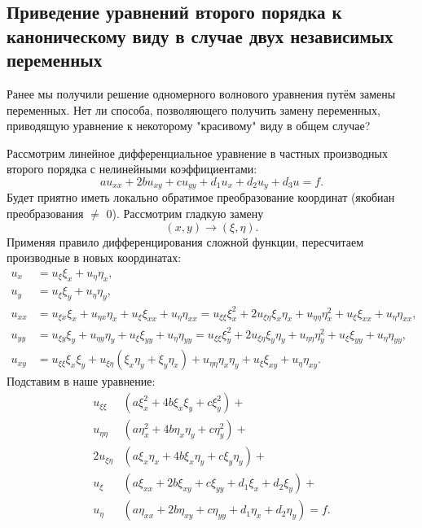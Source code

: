 
\subsection{Приведение уравнений второго порядка к каноническому виду в случае двух независимых переменных}

Ранее мы получили решение одномерного волнового уравнения путём замены переменных. Нет ли способа, позволяющего получить замену переменных, приводящую уравнение к некоторому "красивому" виду в общем случае?

Рассмотрим линейное дифференциальное уравнение в частных производных второго порядка с нелинейными коэффициентами:
$$ a u_{xx} + 2bu_{xy} + c u_{yy} + d_1 u_x + d_2 u_y + d_3 u = f.$$
Будет приятно иметь локально обратимое преобразование координат (якобиан преобразования $\neq$ 0). Рассмотрим гладкую замену 
$$(x,y) \rightarrow (\xi, \eta).$$
Применяя правило дифференцирования сложной функции, пересчитаем производные в новых координатах:
\begin{align*}
	u_x &= u_\xi \xi_x + u_\eta \eta_x, \\
	u_y &= u_\xi \xi_y + u_\eta \eta_y, \\
	u_{xx} &= u_{\xi x} \xi_x + u_{\eta x} \eta_x + u_\xi \xi_{xx} + u_\eta \eta_{xx} = u_{\xi \xi} \xi^2_x + 2u_{\xi \eta} \xi_x \eta_x + u_{\eta \eta} \eta^2_x + u_\xi \xi_{xx} + u_\eta \eta_{xx}, \\
	u_{yy} &= u_{\xi y} \xi_y + u_{\eta y} \eta_y + u_\xi \xi_{yy} + u_\eta \eta_{yy} = u_{\xi \xi} \xi^2_y + 2u_{\xi \eta} \xi_y \eta_y + u_{\eta \eta} \eta^2_y + u_\xi \xi_{yy} + u_\eta \eta_{yy}, \\
	u_{xy} &= u_{\xi \xi} \xi_x \xi_y + u_{\xi \eta} (\xi_x \eta_y + \xi_y \eta_x) + u_{\eta \eta} \eta_x \eta_y + u_\xi \xi_{xy} + u_\eta \eta_{xy}.
\end{align*}
Подставим в наше уравнение:
\begin{align*}
	u_{\xi \xi} & (a \xi^2_x + 4b \xi_x \xi_y + c \xi^2_y) + \\
	u_{\eta \eta} & (a \eta^2_x + 4b \eta_x \eta_y + c \eta^2_y) +\\
	2 u_{\xi \eta} & (a \xi_x \eta_x + 4b \xi_x \eta_y + c \xi_y \eta_y) + \\
	u_\xi & (a \xi_{xx} + 2b \xi_{xy} + c \xi_{yy} + d_1\xi_x + d_2 \xi_y) + \\
	u_\eta & (a \eta_{xx} + 2b \eta_{xy} + c \eta_{yy} + d_1 \eta_x + d_2 \eta_y) = f.
\end{align*}

